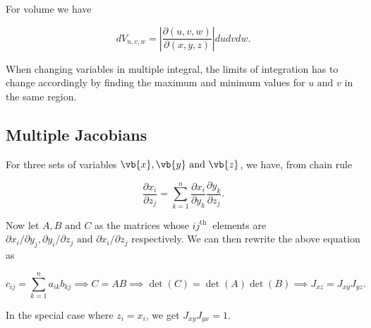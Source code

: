 \documentclass[english,a4paper,12pt]{report}
\begin{document}
For volume we have

\begin{equation}
	dV_{u,v,w} = \left| \frac{\partial (u,v,w)}{\partial (x,y,z)}\right| dudvdw.  
\end{equation}

When changing variables in multiple integral, the limits of integration has to change accordingly by finding the maximum and minimum values for \(u \text { and } v\) in the same region. 

\subsection{Multiple Jacobians}

For three sets of variables \(\vb{x} ,\vb{y} \text { and } \vb{z} \), we have, from chain rule

\begin{equation}
	\frac{\partial x_{i} }{\partial z_{j} } = \sum_{k=1}^{n} \frac{\partial x_{i} }{\partial y_{k} } \frac{\partial y_{k} }{\partial z_{j} }.   
\end{equation}

Now let \(A, B \text { and } C\) as the matrices whose \(ij^{\text{th }} \) elements are \(\partial x_{i} / \partial y_{j} , \partial y_{i} / \partial z_{j}  \text { and } \partial x_{i}/ \partial z_{j} \) respectively. We can then rewrite the above equation as 

\begin{equation}
	c_{ij} = \sum_{k=1}^{n} a_{ik}b_{kj} \implies C = AB \implies \det (C) = \det (A) \det (B) \implies J_{xz} = J_{xy} J_{yz}.   
\end{equation}

In the special case where \(z_{i} = x_{i}  \), we get \(J_{xy}J_{yx} =1  \).  
\end{document}
